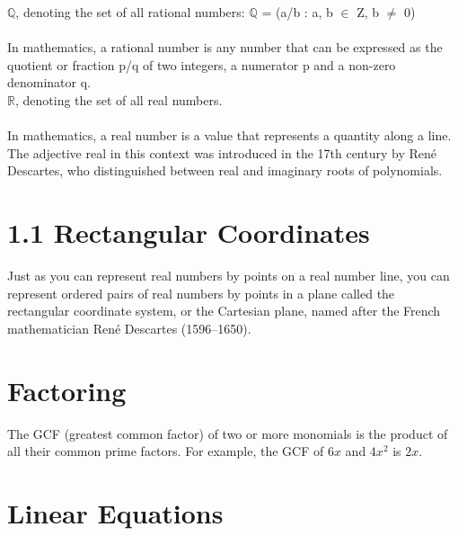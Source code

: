 \documentclass[12pt, letterpaper]{article}
\begin{document}
\noindent$\mathbb{Q}$, denoting the set of all rational numbers: $\mathbb{Q}$ =
(a/b : a, b $\in$ Z, b $\neq$ 0)
\\\\
In mathematics, a rational number is any number that can be expressed as the quotient or fraction p/q of two integers, a numerator p and a non-zero denominator q.
\\

\noindent$\mathbb{R}$, denoting the set of all real numbers.
\\\\
In mathematics, a real number is a value that represents a quantity along a line. The adjective real in this context was introduced in the 17th century by René Descartes, who distinguished between real and imaginary roots of polynomials.
\\

\section{1.1 Rectangular Coordinates}

Just as you can represent real numbers by points on a real number line, you can
represent ordered pairs of real numbers by points in a plane called the
rectangular coordinate system, or the Cartesian plane, named after the French
mathematician René Descartes (1596–1650).

\section{Factoring}

The GCF (greatest common factor) of two or more monomials is the product of all their
common prime factors. For example, the GCF of $6x$ and $4x^2$ is $2x$.

\section{Linear Equations}
\end{document}
